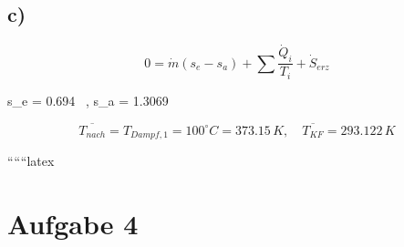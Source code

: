 

\subsection*{c)}


\[
0 = \dot{m} (s_e - s_a) + \sum \frac{\dot{Q}_i}{T_i} + \dot{S}_{erz}
\]

 \quad s_e = 0.694 \, , \quad s_a = 1.3069 \, 

\[
\overline{T_{nach}} = T_{Dampf,1} = 100^\circ C = 373.15 \, K, \quad \overline{T_{KF}} = 293.122 \, K
\]

``````latex


\section*{Aufgabe 4}